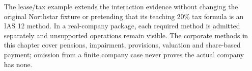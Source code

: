 The lease/tax example extends the interaction evidence without changing the original Northstar fixture or pretending that its teaching 20\% tax formula is an IAS 12 method. In a real-company package, each required method is admitted separately and unsupported operations remain visible. The corporate methods in this chapter cover pensions, impairment, provisions, valuation and share-based payment; omission from a finite company case never proves the actual company has none.
